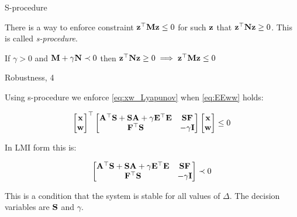 \documentclass{beamer}
\begin{document}
	\begin{frame}{S-procedure}
		\begin{flushleft}
			
			There is a way to enforce constraint $\mathbf{z}^\top \mathbf{M}\mathbf{z} \leq 0$ for such $\mathbf{z}$ that $\mathbf{z}^\top \mathbf{N}\mathbf{z} \geq 0$. This is called \emph{s-procedure}.
			
			\begin{theorem}
				If $\gamma > 0$ and $\mathbf{M} + \gamma \mathbf{N} \prec 0$ then $\mathbf{z}^\top \mathbf{N}\mathbf{z} \geq 0 \implies \mathbf{z}^\top \mathbf{M}\mathbf{z} \leq 0$ 
			\end{theorem}
			
		\end{flushleft}
	\end{frame}
	
	
	
	\begin{frame}{Robustness, 4}
		\begin{flushleft}
			
			
			Using s-procedure we enforce \eqref{eq:xw_Lyapunov} when \eqref{eq:EEww} holds:
			
			\begin{equation}
				\begin{bmatrix}
					\mathbf{x} \\ \mathbf{w}
				\end{bmatrix}^\top
				\begin{bmatrix}
					\mathbf{A}^\top \mathbf{S} + \mathbf{S}\mathbf{A} + \gamma \mathbf{E}^\top \mathbf{E} & \mathbf{S}\mathbf{F} \\
					\mathbf{F}^\top\mathbf{S} & -\gamma\mathbf{I}
				\end{bmatrix}		
				\begin{bmatrix}
					\mathbf{x} \\ \mathbf{w}
				\end{bmatrix}
				\leq 0
			\end{equation}
			
			In LMI form this is:
			
			\begin{equation}
				\begin{bmatrix}
					\mathbf{A}^\top \mathbf{S} + \mathbf{S}\mathbf{A} + \gamma \mathbf{E}^\top \mathbf{E} & \mathbf{S}\mathbf{F} \\
					\mathbf{F}^\top\mathbf{S} & -\gamma\mathbf{I}
				\end{bmatrix}		
				\prec 0
			\end{equation}	
			
			
			This is a condition that the system is stable for all values of $\Delta$. The decision variables are $\mathbf{S}$ and $\gamma$.		
			
		\end{flushleft}
	\end{frame}
	
\end{document}
